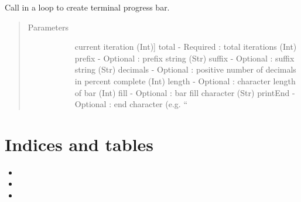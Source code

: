 \documentclass[letterpaper,10pt,english]{sphinxmanual}
\begin{document}
\begin{fulllineitems}
\label{\detokenize{index:gps2net.printProgressBar}}
Call in a loop to create terminal progress bar.
\begin{quote}\begin{description}
\item[{Parameters}] \leavevmode\begin{description}
\item[{}] \leavevmode{[}current iteration (Int){]}
total       - Required  : total iterations (Int)
prefix      - Optional  : prefix string (Str)
suffix      - Optional  : suffix string (Str)
decimals    - Optional  : positive number of decimals in percent complete (Int)
length      - Optional  : character length of bar (Int)
fill        - Optional  : bar fill character (Str)
printEnd    - Optional  : end character (e.g. “

\item[{}] \leavevmode
\item[{}] \leavevmode
\end{description}

\end{description}\end{quote}

\end{fulllineitems}



\chapter{Indices and tables}
\label{\detokenize{index:indices-and-tables}}\begin{itemize}
\item {} 

\item {} 

\item {} 

\end{itemize}


\renewcommand{\indexname}{Python Module Index}
\begin{sphinxtheindex}
\let\bigletter\sphinxstyleindexlettergroup
\bigletter{g}
\item\relax{}
\end{sphinxtheindex}

\renewcommand{\indexname}{Index}
\printindex
\end{document}

